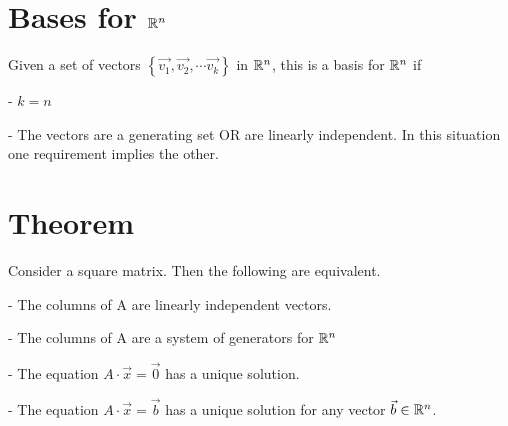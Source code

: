 \documentclass[a4paper]{article}
\begin{document}
\section{Bases for $\mathbb{R}^n$}

Given a set of vectors $\left\{ \vec{v_1}, \vec{v_2}, \cdots \vec{v_k} \right\}$ in $\mathbb{R}^n$, this is a basis for $\mathbb{R}^n$ if 

- $k = n$

- The vectors are a generating set OR are linearly independent. In this situation one requirement implies the other.

\section{Theorem}

Consider a square matrix. Then the following are equivalent. 

- The columns of A are linearly independent vectors.

- The columns of A are a system of generators for $\mathbb{R}^n$

- The equation $A \cdot \vec{x} = \vec{0}$ has a unique solution.

- The equation $A \cdot \vec{x} = \vec{b}$ has a unique solution for any vector $\vec{b} \in \mathbb{R}^n$.
\end{document}
